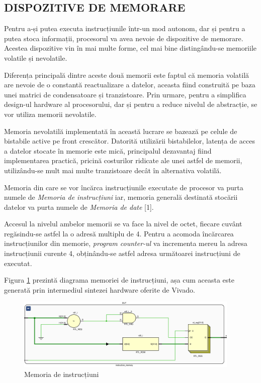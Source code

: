 \documentclass[12pt]{article}
\begin{document}
 \subsection{DISPOZITIVE DE MEMORARE}
 	Pentru a-și putea executa instrucțiunile într-un mod autonom, dar și pentru a putea stoca informații, procesorul va avea nevoie de dispozitive de memorare. Acestea dispozitive vin în mai multe forme, cel mai bine distingându-se memoriile volatile și nevolatile.
 	
 	 Diferența principală dintre aceste două memorii este faptul că memoria volatilă are nevoie de o constantă reactualizare a datelor, aceasta fiind construită pe baza unei matrici de condensatoare și tranzistoare. Prin urmare, pentru a simplifica design-ul hardware al procesorului, dar și pentru a reduce nivelul de abstracție, se vor utiliza memorii nevolatile.
 	 
 	 Memoria nevolatilă implementată în această lucrare se bazează pe celule de bistabile active pe front crescător. Datorită utilizării bistabilelor, latența de acces a datelor stocate în memorie este mică, principalul dezavantaj fiind implementarea practică, pricină costurilor ridicate ale unei astfel de memorii, utilizându-se mult mai multe tranzistoare decât în alternativa volatilă.
 	 
 	 Memoria din care se vor încărca instrucțiunile executate de procesor va purta numele de \textit{Memoria de instrucțiuni} iar, memoria generală destinată stocării datelor va purta numele de \textit{Memoria de date} [1].
 	 
	Accesul la nivelul ambelor memorii se va face la nivel de octet, fiecare cuvânt regăsindu-se astfel la o adresă multiplu de 4. Pentru a acomoda încărcarea instrucțiunilor din memorie, \textit{program counter-ul} va incrementa mereu la adresa instrucțiunii curente 4, obținându-se astfel adresa următoarei instrucțiuni de executat.
	
	Figura \ref{Figura:30} prezintă diagrama memoriei de instrucțiuni, așa cum aceasta este generată prin intermediul sintezei hardware oferite de Vivado.
	
\begin{figure}[h!]
 \includegraphics[width=0.95\textwidth]{instmem.png}
 \centering
 \caption{Memoria de instrucțiuni}
 \label{Figura:30}
 \end{figure}
 
\end{document}
